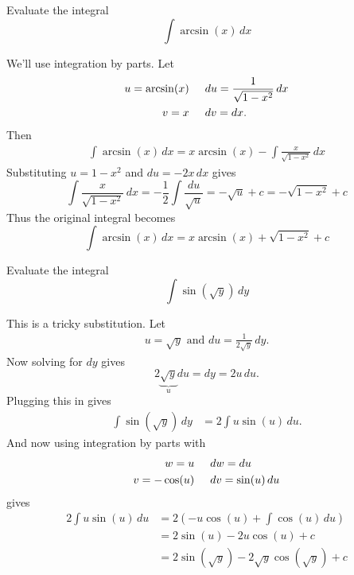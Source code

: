 \documentclass{article}
\newenvironment{problem}[2][Problem]{\begin{trivlist}
\item[\hskip \labelsep {\bfseries #1}\hskip \labelsep {\bfseries #2.}]}{\end{trivlist}}
\newenvironment{solution}[1][Solution.]{\begin{trivlist}
\item[\hskip \labelsep {\bfseries #1}]}{\end{trivlist}}
\begin{document}
\pagebreak
\begin{problem}{3}
  Evaluate the integral \[
    \int \arcsin(x)\,dx
  \]
\end{problem}

\begin{solution} $ $\\
  We'll use integration by parts. Let \begin{align*}
    u = \arcsin(x)  &\hspace{0.5cm} du = \frac{1}{\sqrt{1 - x^2}}\,dx \\
    v = x &\hspace{0.5cm} dv = dx.
  \end{align*}
  Then \begin{align*}
    \int \arcsin(x)\,dx = x\arcsin(x) - \int \frac{x}{\sqrt{1 - x^2}}\,dx
  \end{align*}
  Substituting $u = 1 - x^2$ and $du = -2x\,dx$ gives \[
    \int \frac{x}{\sqrt{1 - x^2}}\,dx
    = -\frac{1}{2}\int \frac{du}{\sqrt{u}}
    = -\sqrt{u} + c
    = -\sqrt{1 - x^2} + c
  \]
  Thus the original integral becomes \[
    \int \arcsin(x)\,dx = x\arcsin(x) + \sqrt{1 - x^2} + c
  \]
\end{solution}

\begin{problem}{4}
  Evaluate the integral \[
    \int \sin(\sqrt{y})\,dy
  \]
\end{problem}

\begin{solution} $ $\\
  This is a tricky substitution. Let \begin{align*}
    u = \sqrt{y} \text{\ \ and\ \ } du = \frac{1}{2\sqrt{y}}\,dy.
  \end{align*}
  Now solving for $dy$ gives \[
    2\underbrace{\sqrt{y}}_udu = dy = 2u\,du.
  \]
  Plugging this in gives \begin{align*}
    \int \sin(\sqrt{y})\,dy &= 2\int u\sin(u)\, du.
  \end{align*}
  And now using integration by parts with \begin{align*}
    w = u  &\hspace{0.5cm} dw = du \\
    v = -\cos(u) &\hspace{0.5cm} dv = \sin(u) \,du
  \end{align*}
  gives \begin{align*}
    2\int u\sin(u)\, du &= 2\left(-u\cos(u) + \int\cos(u)\, du\right) \\
    &= 2\sin(u) -2u\cos(u) + c\\
    &= 2\sin(\sqrt{y}) -2\sqrt{y}\cos(\sqrt{y}) + c
  \end{align*}
\end{solution}
\end{document}
